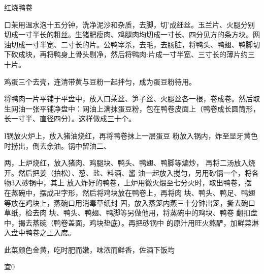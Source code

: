 \begin{recipe}{红烧鸭卷}

\ingredients



\cooking

\step 口茉用温水泡十五分钟，洗净泥沙和杂质，去脚，切’成细丝。玉兰片、火腿分别切成一寸半长的粗丝。生猪肥瘦肉、鸡腿肉均切成一寸长、四分见方的条方块。网油切成一寸半宽、二寸长的片。公鸭宰杀，去毛，去肠脏，将鸭头、鸭翅、鸭脚切下砍成块，再将鸭身上骨头剔净，然后将鸭肉:片成一寸半宽、三寸长的薄片约三十片。

\step 鸡蛋三个去壳，连清带黄与豆粉一起拌匀，成为蛋豆粉待用。

\step 将鸭肉一片平铺于平盘中，放入口茉丝、笋子丝、火腿丝各一根，卷成卷。然后取生网油一张平铺净盘中：网油上满抹蛋豆粉，包在鸭卷皮面上（鸭卷成长圆筒形，长一寸半、直径四分）。这样做成三十个。

I锅放火炉上，放入猪油烧红，再将鸭卷抹上一层蛋豆 粉放入锅内，炸至显牙黄色时捞出，倒去余油。锅中留油二、

两，上炉烧红，放入猪肉、鸡腿块、鸭头、鸭翅、鸭脚等煸炒， 再将二汤放入烧开。然后把姜（拍松）、葱、盐、料酒、酱 油一起放入搅匀，另用砂锅一个，将各物3入砂锅中，其上 放入炸好的鸭卷，上炉用微火煨至七分火时，取出鸭卷，摆 在蒸碗中，摆成卍字形，然后将鸡块放在鸭卷上，再将肉 块、鸭头、鸭足、鸭翅等放在鸡块上，蒸碗口用消毒草纸封 固，放入蒸笼内蒸三十分钟出笼，撕去碗口草纸，检去肉 块、鸭头、鸭翅、鸭脚等另做他用，将蒸碗中的鸡块、鸭卷 翻扣盘中，揭去蒸碗（鸭卷盖面，鸡块垫底）。再把砂锅中 的原汁用旺火熬酽，加鲜菜淋入盘中鸭卷之上入席。

\notes

此菜颜色金黄，吃时肥而嫩，味浓而鲜香，佐酒下饭均

宜0

\end{recipe}

